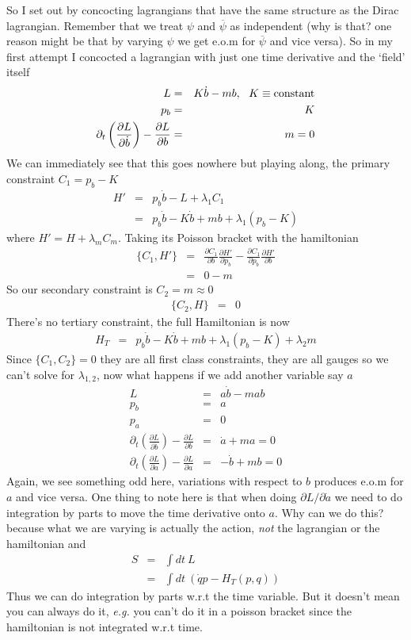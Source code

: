 \documentclass[aps,preprint,preprintnumbers,nofootinbib,showpacs,prd]{revtex4-1}
\newcommand{\eg}{{\it e.g.} }
\newcommand{\nbea}{\begin{eqnarray*}}
\newcommand{\neea}{\end{eqnarray*}}
\begin{document}
So I set out by concocting lagrangians that have the same structure as the Dirac lagrangian. Remember that we treat $\psi$ and $\overline \psi$ as independent (why is that? one reason might be that by varying $\psi$ we get e.o.m for $\overline \psi$ and vice versa). So in my first attempt I concocted a lagrangian with just one time derivative and the `field' itself
%
\nbea
L & = & K \dot b -m b, ~~K \equiv {\rm constant} \\
p_b & = & K \\
\partial_t \left ( \frac{\partial L}{\partial \dot b}\right ) - \frac{\partial L}{\partial b} & = & m = 0
\neea
%
We can immediately see that this goes nowhere but playing along, the primary constraint $C_1 = p_b - K$
%
\nbea
H' & = & p_b \dot b - L  + \lambda_1 C_1\\
& = & p_b \dot b - K\dot b + m b + \lambda_1(p_b - K)
\neea
%
where $H' = H + \lambda_m C_m$. Taking its Poisson bracket with the hamiltonian
%
\nbea
\{ C_1, H' \} & = & \frac{\partial C_1}{\partial b} \frac{\partial H'}{\partial p_b} - \frac{\partial C_1}{\partial p_b} \frac{\partial H'}{\partial b} \\
& = & 0 - m
\neea
%
So our secondary constraint is $C_2 = m \approx 0$
%
\nbea
\{ C_2, H \} & = & 0
\neea
%
There's no tertiary constraint, the full Hamiltonian is now
%
\nbea
H_T & = &  p_b \dot b - K\dot b + m b + \lambda_1(p_b - K) + \lambda_2 m
\neea
%
Since $\{ C_1, C_2 \} = 0$ they are all first class constraints, they are all gauges so we can't solve for $\lambda_{1,2}$, now what happens if we add another variable say $a$
%
\nbea
L & = & a \dot b -m ab \\
p_b & = & a \\
p_a & = & 0 \\
\partial_t \left ( \frac{\partial L}{\partial \dot b}\right ) - \frac{\partial L}{\partial b} & = & \dot a + ma = 0 \\
\partial_t \left ( \frac{\partial L}{\partial \dot a}\right ) - \frac{\partial L}{\partial a} & = & -\dot b + mb = 0
\neea
%
Again, we see something odd here, variations with respect to $b$ produces e.o.m for $a$ and vice versa. One thing to note here is that when doing $\partial L/\partial \dot a$ we need to do integration by parts to move the time derivative onto $a$. Why can we do this? because what we are varying is actually the action, {\it not} the lagrangian or the hamiltonian and
%
\nbea
S & = & \int dt~L \\
& = & \int dt ~ (\dot q p - H_T(p,q))
\neea
%
Thus we can do integration by parts w.r.t the time variable. But it doesn't mean you can always do it, \eg you can't do it in a poisson bracket since the hamiltonian is not integrated w.r.t time.
\end{document}
